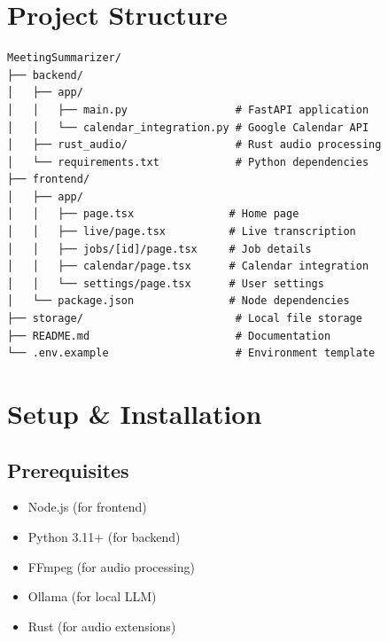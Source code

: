 \documentclass[11pt,a4paper]{article}
\begin{document}
\section*{Project Structure}

\begin{verbatim}
MeetingSummarizer/
├── backend/
│   ├── app/
│   │   ├── main.py                 # FastAPI application
│   │   └── calendar_integration.py # Google Calendar API
│   ├── rust_audio/                 # Rust audio processing
│   └── requirements.txt            # Python dependencies
├── frontend/
│   ├── app/
│   │   ├── page.tsx               # Home page
│   │   ├── live/page.tsx          # Live transcription
│   │   ├── jobs/[id]/page.tsx     # Job details
│   │   ├── calendar/page.tsx      # Calendar integration
│   │   └── settings/page.tsx      # User settings
│   └── package.json               # Node dependencies
├── storage/                        # Local file storage
├── README.md                       # Documentation
└── .env.example                    # Environment template
\end{verbatim}

\section*{Setup \& Installation}

\subsection*{Prerequisites}
\begin{itemize}[leftmargin=*, itemsep=4pt]
    \item Node.js (for frontend)
    \item Python 3.11+ (for backend)
    \item FFmpeg (for audio processing)
    \item Ollama (for local LLM)
    \item Rust (for audio extensions)
\end{itemize}
\end{document}

